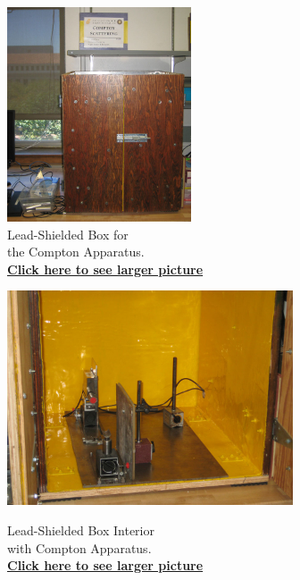 \documentclass{../lab}
\begin{document}
\begin{figure}[H]
\captionsetup{justification=centering}
\begin{minipage}{.40\linewidth}
    \centering
    \href{http://experimentationlab.berkeley.edu/sites/default/files/images/COM_3526-Lg.JPG}{\includegraphics[height=180pt,keepaspectratio]{images/COM_3526-Lg.JPG}} \\
    \caption{Lead-Shielded Box for \\ the Compton Apparatus. \\ \href{http://experimentationlab.berkeley.edu/sites/default/files/images/COM_3526-Lg.JPG}{\textbf{Click here to see larger picture}}}
\end{minipage}\hfill
\begin{minipage}{.59\linewidth}
    \centering
    \href{http://experimentationlab.berkeley.edu/sites/default/files/images/COM_Inside_3525-Lg.JPG}{\includegraphics[height=180pt,keepaspectratio]{images/COM_Inside_3525-Lg.JPG}} \\
    \caption{Lead-Shielded Box Interior \\ with Compton Apparatus. \\ \href{http://experimentationlab.berkeley.edu/sites/default/files/images/COM_Inside_3525-Lg.JPG}{\textbf{Click here to see larger picture}}}
\end{minipage} 
\end{figure}
\end{document}
